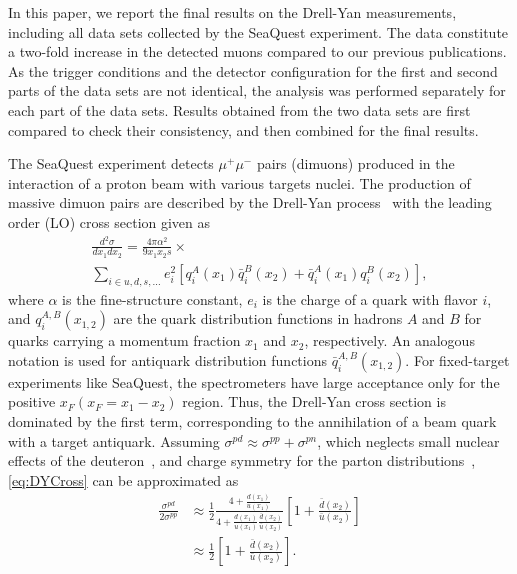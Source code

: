 \documentclass[reprint,aps,unsortedaddress,superscriptaddress,prl,floatfix,showpacs,linenumbers]{revtex4-2}
\begin{document}
In this paper, we report the final results on the Drell-Yan measurements,
including all data sets collected by the SeaQuest experiment.
The data constitute a two-fold increase in the detected muons compared
to our previous publications. As the trigger
conditions and the detector configuration for the first and second parts
of the data sets are not
identical, the analysis was performed separately for each part of the
data sets.
Results obtained from the two data sets are first compared to check their
consistency, and then combined for the final results.

The SeaQuest experiment detects $\mu^+\mu^-$ pairs (dimuons) produced in
the interaction of a proton beam with various targets nuclei. The production
of massive dimuon pairs are described by the Drell-Yan
process~\cite{drell1970} with the leading order (LO) cross section given as
\begin{multline}
	\frac{d^2\sigma}{dx_1dx_2}=\frac{4\pi \alpha^2}{9x_1x_2s} \times
	\label{eq:DYCross} \\
	\sum_{i\in u,d,s,\dots} e_i^2 \left[q_i^A\left(x_1\right) \bar q_i^B\left(x_2\right) + \bar q_i^A\left(x_1\right)
		q_i^B\left(x_2\right)\right],
\end{multline}
where $\alpha$ is the fine-structure constant, $e_i$ is the charge of a quark
with flavor $i$, and $q_i^{A,B}\left(x_{1,2}\right)$ are the quark
distribution functions in hadrons $A$ and $B$
for quarks carrying a momentum fraction $x_1$ and $x_2$, respectively.
An analogous notation is used for antiquark distribution functions
$\bar q_i^{A,B}\left(x_{1,2}\right)$.
For fixed-target experiments like SeaQuest, the spectrometers have
large acceptance only for the positive $x_F (x_F = x_1 - x_2)$ region. %
Thus, the Drell-Yan cross section is dominated by
the first term, corresponding to the annihilation of a beam quark with
a target antiquark. Assuming
$\sigma^{pd} \approx \sigma^{pp} + \sigma^{pn}$,
which neglects small nuclear effects of the
deuteron~\cite{kumano1998,ehlers2014},
and charge symmetry for the parton distributions~\cite{londergan2010},
\cref{eq:DYCross} can be approximated as
\begin{equation}
	\begin{split}
		\frac{\sigma^{pd}}{2\sigma^{pp}} & \approx
		\frac{1}{2} \frac{4+\frac{d\left(x_1\right)}
			{u\left(x_1\right)}}{4+\frac{d\left(x_1\right)}
			{u\left(x_1\right)}\frac{\bar d\left(x_2\right)}{\bar u\left(x_2\right)}}
		\left[1+\frac{\bar d\left(x_2\right)}{\bar u\left(x_2\right)}\right]                         \\
		                                 & \approx \frac{1}{2} \left[1+\frac{\bar d\left(x_2\right)}
			{\bar u\left(x_2\right)}\right].
	\end{split}
	\label{eq:crRatio}
\end{equation}
\end{document}
